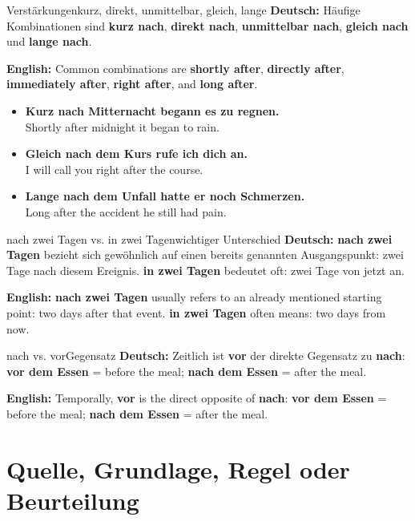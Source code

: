 \documentclass[a4paper,11pt]{article}
\newcommand{\GermanText}[1]{\textbf{Deutsch: }#1\par}
\newcommand{\EnglishText}[1]{{\small\color{SoftGray}\textbf{English: }#1\par}}
\newcommand{\ExampleItem}[2]{\item \textbf{#1}\\{\small\color{SoftGray}#2}}
\begin{document}
        \begin{grammarentry}{Verstärkungen}{kurz, direkt, unmittelbar, gleich, lange}
            \GermanText{Häufige Kombinationen sind \textbf{kurz nach}, \textbf{direkt nach}, \textbf{unmittelbar nach}, \textbf{gleich nach} und \textbf{lange nach}.}
            \EnglishText{Common combinations are \textbf{shortly after}, \textbf{directly after}, \textbf{immediately after}, \textbf{right after}, and \textbf{long after}.}
        \end{grammarentry}

        \begin{exbox}
            \begin{itemize}
                \ExampleItem{Kurz nach Mitternacht begann es zu regnen.}{Shortly after midnight it began to rain.}
                \ExampleItem{Gleich nach dem Kurs rufe ich dich an.}{I will call you right after the course.}
                \ExampleItem{Lange nach dem Unfall hatte er noch Schmerzen.}{Long after the accident he still had pain.}
            \end{itemize}
        \end{exbox}

        \begin{grammarentry}{nach zwei Tagen vs. in zwei Tagen}{wichtiger Unterschied}
            \GermanText{\textbf{nach zwei Tagen} bezieht sich gewöhnlich auf einen bereits genannten Ausgangspunkt: zwei Tage nach diesem Ereignis. \textbf{in zwei Tagen} bedeutet oft: zwei Tage von jetzt an.}
            \EnglishText{\textbf{nach zwei Tagen} usually refers to an already mentioned starting point: two days after that event. \textbf{in zwei Tagen} often means: two days from now.}
        \end{grammarentry}

        \begin{grammarentry}{nach vs. vor}{Gegensatz}
            \GermanText{Zeitlich ist \textbf{vor} der direkte Gegensatz zu \textbf{nach}: \textbf{vor dem Essen} = before the meal; \textbf{nach dem Essen} = after the meal.}
            \EnglishText{Temporally, \textbf{vor} is the direct opposite of \textbf{nach}: \textbf{vor dem Essen} = before the meal; \textbf{nach dem Essen} = after the meal.}
        \end{grammarentry}


    \section{Quelle, Grundlage, Regel oder Beurteilung}
\end{document}
